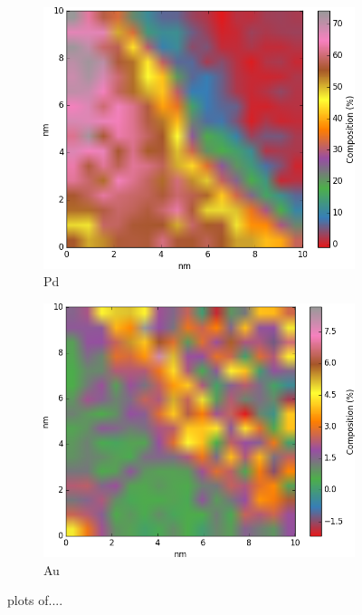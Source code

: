 \begin{figure}
\begin{subfigure}{0.45\textwidth}
		\includegraphics[width=\textwidth]{fig/q/D-E-trim/D_heatedGeKlineHEATMAP/Pd_zeta}
		\caption{Pd}
		\label{fig:Dpd}
	\end{subfigure}
\hfill
		\begin{subfigure}{0.45\textwidth}
		\includegraphics[width=\textwidth]{fig/q/D-E-trim/D_heatedAUHEATMAP/Au_zeta}
		\caption{Au}
		\label{fig:Dau}
	\end{subfigure}
	\caption{plots of....}
	\label{fig:D}
\end{figure}

